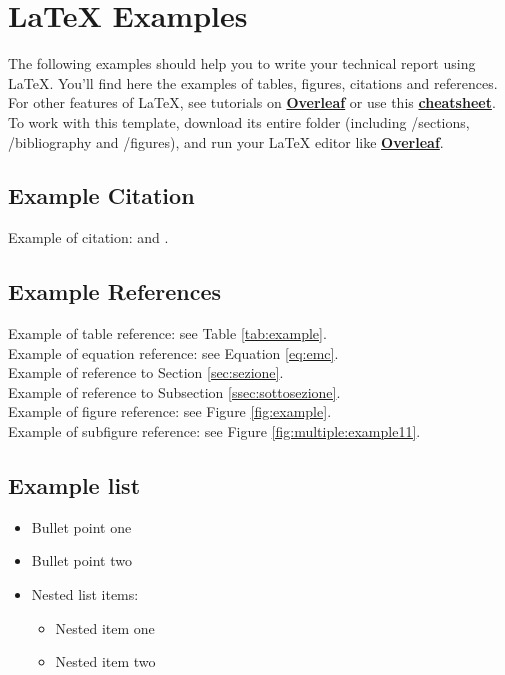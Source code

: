 \section{\LaTeX{} Examples}
The following examples should help you to write your technical report using \LaTeX{}. You'll find here the examples of tables, figures, citations and references. For other features of \LaTeX{}, see tutorials on \href{https://www.overleaf.com/learn}{\textbf{Overleaf}} or use this \href{https://wch.github.io/latexsheet/}{\textbf{cheatsheet}}. To work with this template, download its entire folder (including /sections, /bibliography and /figures), and run your \LaTeX{} editor like \href{https://www.overleaf.com}{\textbf{Overleaf}}.


\subsection*{Example Citation}
Example of citation: \cite{Smith_2013} and \cite{Smith_2012}. 


\subsection*{Example References}
Example of table reference: see Table \ref{tab:example}. \\
Example of equation reference: see Equation \eqref{eq:emc}. \\
Example of reference to Section \ref{sec:sezione}. \\
Example of reference to Subsection \ref{ssec:sottosezione}. \\
Example of figure reference: see Figure \ref{fig:example}.\\
Example of subfigure reference: see Figure \ref{fig:multiple:example11}.\\


\subsection*{Example list}
\begin{itemize}
\item Bullet point one
\item Bullet point two
\item Nested list items:
\begin{itemize}
\item Nested item one
\item Nested item two
\end{itemize}
\end{itemize}


